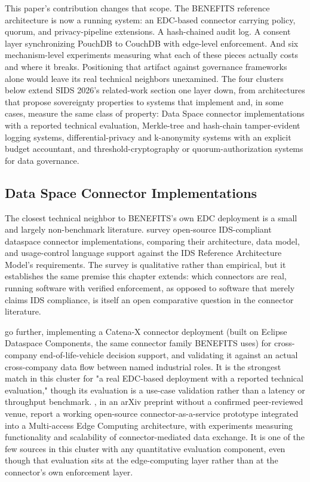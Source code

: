 This paper's contribution changes that scope. The BENEFITS reference architecture is now a running system: an EDC-based connector carrying policy, quorum, and privacy-pipeline extensions. A hash-chained audit log. A consent layer synchronizing PouchDB to CouchDB with edge-level enforcement. And six mechanism-level experiments measuring what each of these pieces actually costs and where it breaks. Positioning that artifact against governance frameworks alone would leave its real technical neighbors unexamined. The four clusters below extend SIDS 2026's related-work section one layer down, from architectures that propose sovereignty properties to systems that implement and, in some cases, measure the same class of property: Data Space connector implementations with a reported technical evaluation, Merkle-tree and hash-chain tamper-evident logging systems, differential-privacy and k-anonymity systems with an explicit budget accountant, and threshold-cryptography or quorum-authorization systems for data governance.

\subsection{Data Space Connector Implementations}

The closest technical neighbor to BENEFITS's own EDC deployment is a small and largely non-benchmark literature. \cite{dam2023} survey open-source IDS-compliant dataspace connector implementations, comparing their architecture, data model, and usage-control language support against the IDS Reference Architecture Model's requirements. The survey is qualitative rather than empirical, but it establishes the same premise this chapter extends: which connectors are real, running software with verified enforcement, as opposed to software that merely claims IDS compliance, is itself an open comparative question in the connector literature.

\cite{mugge2023} go further, implementing a Catena-X connector deployment (built on Eclipse Dataspace Components, the same connector family BENEFITS uses) for cross-company end-of-life-vehicle decision support, and validating it against an actual cross-company data flow between named industrial roles. It is the strongest match in this cluster for "a real EDC-based deployment with a reported technical evaluation," though its evaluation is a use-case validation rather than a latency or throughput benchmark. \cite{kalogeropoulos2023}, in an arXiv preprint without a confirmed peer-reviewed venue, report a working open-source connector-as-a-service prototype integrated into a Multi-access Edge Computing architecture, with experiments measuring functionality and scalability of connector-mediated data exchange. It is one of the few sources in this cluster with any quantitative evaluation component, even though that evaluation sits at the edge-computing layer rather than at the connector's own enforcement layer.

